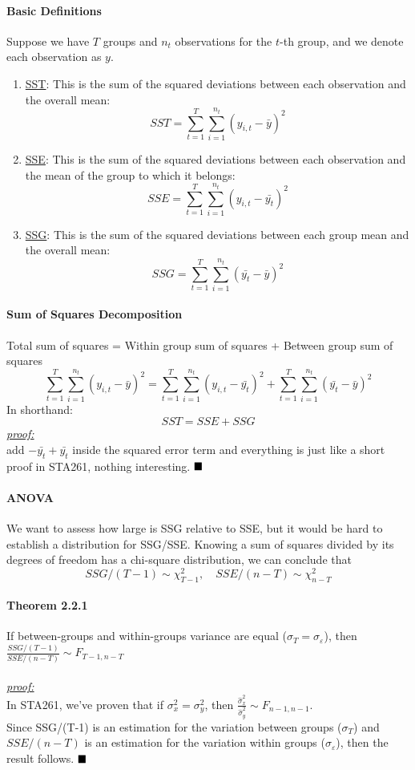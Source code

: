 \documentclass[11pt]{article}
\newcommand{\under}[1]{\underline{#1}}
\newcommand{\proof}[0]{\textit{\underline{proof:} }}
\newcommand{\qed}[0]{$\hfill\blacksquare$}
\begin{document}
\paragraph{Basic Definitions}
Suppose we have $T$ groups and $n_t$ observations for the $t$-th group, and we denote each observation as $y$.
\begin{enumerate}
	\item \under{SST}: This is the sum of the squared deviations between each observation and the overall mean:
	$$SST = \sum_{t=1}^T\sum_{i=1}^{n_t}(y_{i,t}-\bar{y})^2$$
	\item \under{SSE}: This is the sum of the squared deviations between each observation and the mean of the group to which it belongs:
	$$SSE = \sum_{t=1}^T\sum_{i=1}^{n_t}(y_{i,t}-\bar{y_t})^2$$
	\item \under{SSG}: This is the sum of the squared deviations between each group mean and the overall mean:
	$$SSG = \sum_{t=1}^T\sum_{i=1}^{n_t}(\bar{y_t}-\bar{y})^2$$
\end{enumerate}

\paragraph{Sum of Squares Decomposition}
Total sum of squares = Within group sum of squares + Between group sum of squares \\
$$\sum_{t=1}^T\sum_{i=1}^{n_t}(y_{i,t}-\bar{y})^2 = \sum_{t=1}^T\sum_{i=1}^{n_t}(y_{i,t}-\bar{y_t})^2 + \sum_{t=1}^T\sum_{i=1}^{n_t}(\bar{y_t}-\bar{y})^2$$
In shorthand:
$$SST = SSE + SSG$$
\proof\\
add $-\bar{y_t}+\bar{y_t}$ inside the squared error term and everything is just like a short proof in STA261, nothing interesting. \qed
\paragraph{ANOVA}
We want to assess how large is SSG relative to SSE, but it would be hard to establish a distribution for SSG/SSE. Knowing a sum of squares divided by its degrees of freedom has a chi-square distribution, we can conclude that
$$SSG/(T-1) \sim \chi_{T-1}^2, \quad SSE/(n-T) \sim \chi_{n-T}^2$$
\paragraph{Theorem 2.2.1} If between-groups and within-groups variance are equal ($\sigma_T = \sigma_\varepsilon$), then $\frac{SSG/(T-1)}{SSE/(n-T)} \sim F_{T-1, n-T}$ \\\\
\proof \\
In STA261, we've proven that if $\sigma_x^2 = \sigma_y^2$, then $\frac{\hat{\sigma}_x^2}{\hat{\sigma}_y^2} \sim F_{n-1,n-1}$.\\ Since SSG/(T-1) is an estimation for the variation between groups ($\sigma_T$) and $SSE/(n-T)$ is an estimation for the variation within groups ($\sigma_\varepsilon$), then the result follows. \qed
\end{document}

